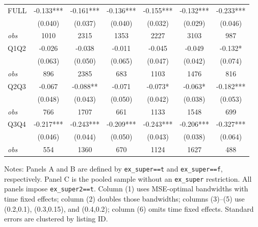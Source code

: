 \begin{table}[!htbp]
\begin{tabular}{lcccccc}
FULL & -0.133*** & -0.161*** & -0.136*** & -0.155*** & -0.132*** & -0.233*** \\
 & (0.040) & (0.037) & (0.040) & (0.032) & (0.029) & (0.046) \\
\textit{obs} & 1010 & 2315 & 1353 & 2227 & 3103 & 987 \\
Q1Q2 & -0.026 & -0.038 & -0.011 & -0.045 & -0.049 & -0.132* \\
 & (0.063) & (0.050) & (0.065) & (0.047) & (0.042) & (0.074) \\
\textit{obs} & 896 & 2385 & 683 & 1103 & 1476 & 816 \\
Q2Q3 & -0.067 & -0.088** & -0.071 & -0.073* & -0.063* & -0.182*** \\
 & (0.048) & (0.043) & (0.050) & (0.042) & (0.038) & (0.053) \\
\textit{obs} & 766 & 1707 & 661 & 1133 & 1548 & 699 \\
Q3Q4 & -0.217*** & -0.243*** & -0.209*** & -0.243*** & -0.206*** & -0.327*** \\
 & (0.046) & (0.044) & (0.050) & (0.043) & (0.038) & (0.064) \\
\textit{obs} & 554 & 1360 & 670 & 1124 & 1627 & 488 \\
\bottomrule
\end{tabular}
\begin{minipage}{0.98\textwidth}\footnotesize
Notes: Panels A and B are defined by \texttt{ex\_super==t} and \texttt{ex\_super==f}, respectively. Panel C is the pooled sample without an \texttt{ex\_super} restriction. All panels impose \texttt{ex\_super2==t}. Column (1) uses MSE-optimal bandwidths with time fixed effects; column (2) doubles those bandwidths; columns (3)--(5) use (0.2,0.1), (0.3,0.15), and (0.4,0.2); column (6) omits time fixed effects. Standard errors are clustered by listing ID.
\end{minipage}
\end{table}
